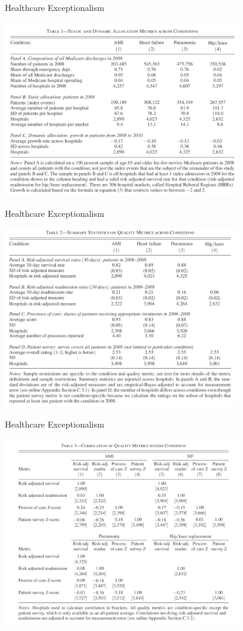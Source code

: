 \documentclass[xcolor=pdftex,dvipsnames,table,mathserif,aspectratio=169]{beamer}
\begin{document}
\begin{frame}{Healthcare Exceptionalism}
\begin{center}
\includegraphics[width=4in]{./resources/hc1.png}
\end{center}
\end{frame}

\begin{frame}{Healthcare Exceptionalism}
\begin{center}
\includegraphics[width=4in]{./resources/hc2.png}
\end{center}
\end{frame}

\begin{frame}{Healthcare Exceptionalism}
\begin{center}
\includegraphics[width=4in]{./resources/hc3.png}
\end{center}
\end{frame}
\end{document}
